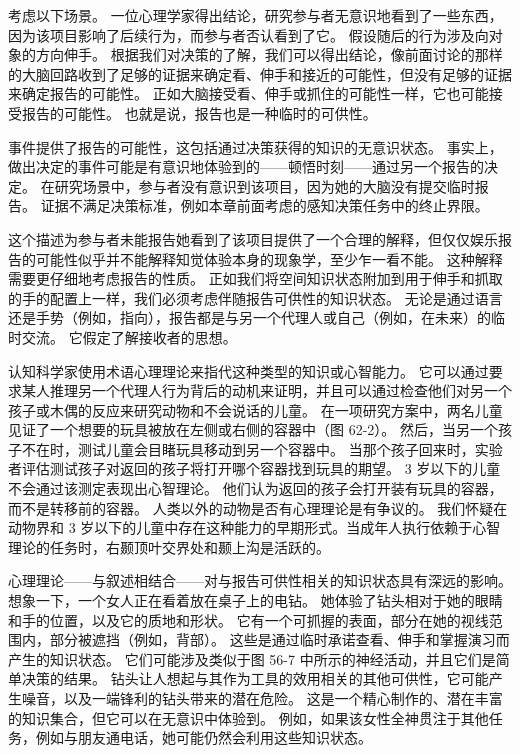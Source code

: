 考虑以下场景。 一位心理学家得出结论，研究参与者无意识地看到了一些东西，因为该项目影响了后续行为，而参与者否认看到了它。 假设随后的行为涉及向对象的方向伸手。 根据我们对决策的了解，我们可以得出结论，像前面讨论的那样的大脑回路收到了足够的证据来确定看、伸手和接近的可能性，但没有足够的证据来确定报告的可能性。 正如大脑接受看、伸手或抓住的可能性一样，它也可能接受报告的可能性。 也就是说，报告也是一种临时的可供性。

事件提供了报告的可能性，这包括通过决策获得的知识的无意识状态。 事实上，做出决定的事件可能是有意识地体验到的——顿悟时刻——通过另一个报告的决定。 在研究场景中，参与者没有意识到该项目，因为她的大脑没有提交临时报告。 证据不满足决策标准，例如本章前面考虑的感知决策任务中的终止界限。

这个描述为参与者未能报告她看到了该项目提供了一个合理的解释，但仅仅娱乐报告的可能性似乎并不能解释知觉体验本身的现象学，至少乍一看不能。 这种解释需要更仔细地考虑报告的性质。 正如我们将空间知识状态附加到用于伸手和抓取的手的配置上一样，我们必须考虑伴随报告可供性的知识状态。 无论是通过语言还是手势（例如，指向），报告都是与另一个代理人或自己（例如，在未来）的临时交流。 它假定了解接收者的思想。

认知科学家使用术语心理理论来指代这种类型的知识或心智能力。 它可以通过要求某人推理另一个代理人行为背后的动机来证明，并且可以通过检查他们对另一个孩子或木偶的反应来研究动物和不会说话的儿童。 在一项研究方案中，两名儿童见证了一个想要的玩具被放在左侧或右侧的容器中（图 62-2）。 然后，当另一个孩子不在时，测试儿童会目睹玩具移动到另一个容器中。 当那个孩子回来时，实验者评估测试孩子对返回的孩子将打开哪个容器找到玩具的期望。 3 岁以下的儿童不会通过该测定表现出心智理论。 他们认为返回的孩子会打开装有玩具的容器，而不是转移前的容器。 人类以外的动物是否有心理理论是有争议的。 我们怀疑在动物界和 3 岁以下的儿童中存在这种能力的早期形式。当成年人执行依赖于心智理论的任务时，右颞顶叶交界处和颞上沟是活跃的。

心理理论——与叙述相结合——对与报告可供性相关的知识状态具有深远的影响。 想象一下，一个女人正在看着放在桌子上的电钻。 她体验了钻头相对于她的眼睛和手的位置，以及它的质地和形状。 它有一个可抓握的表面，部分在她的视线范围内，部分被遮挡（例如，背部）。 这些是通过临时承诺查看、伸手和掌握演习而产生的知识状态。 它们可能涉及类似于图 56-7 中所示的神经活动，并且它们是简单决策的结果。 钻头让人想起与其作为工具的效用相关的其他可供性，它可能产生噪音，以及一端锋利的钻头带来的潜在危险。 这是一个精心制作的、潜在丰富的知识集合，但它可以在无意识中体验到。 例如，如果该女性全神贯注于其他任务，例如与朋友通电话，她可能仍然会利用这些知识状态。

